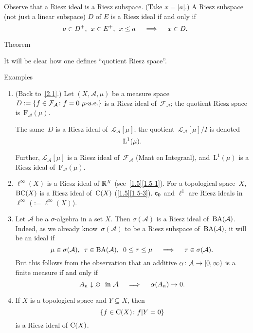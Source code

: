 \documentclass[main.tex]{subfiles}
\begin{document}
Observe that a Riesz ideal is a Riesz subspace. 
(Take $x=|a|$.)
A Riesz subspace (not just a linear subspace) $D$ of $E$
is a Riesz ideal if and only if 
\begin{equation*}
a\in D^+\text{, }\; x\in E^+\text{, }\; x\leq a 
  \quad \implies \quad x\in D\text{. }
\end{equation*}
%
%
\begin{psec}{2.7}{Theorem}

It will be clear
how one defines
``quotient Riesz space''.
\end{psec}
%
%
\begin{psec}{2.8}{Examples}
\begin{enumerate}
\item \label{2.8-1}%
(Back to~\ref{2.1}.)
Let $(X,\mathcal A, \mu)$ be a measure space
$D:=\{f\in {\mathcal F}_{\mathcal A}\colon f=0\ \mu\text{-a.e.} \}$
is a Riesz ideal of~${\mathcal F}_{\mathcal A}$;
the quotient Riesz space is~$\mathrm{F}_{\mathcal A} (\mu)$.

The same~$D$ is a Riesz ideal of~$\mathcal{L}_{\mathcal A}[\mu]$;
the quotient~${\mathcal L}_{\mathcal A}[\mu]/I$ is denoted
\begin{equation*}
\mathrm{L}^1(\mu)\text{.}
\end{equation*}

Further,
$\mathcal{L}_{\mathcal A}[\mu]$ 
is a Riesz ideal of~${\mathcal F}_{\mathcal A}$
(Maat en Integraal),
and~$\mathrm{L}^1(\mu)$ is a Riesz ideal of~$\mathrm{F}_{\mathcal A}(\mu)$.
%
\item \label{2.8-2}
$\ell^\infty(X)$ is a Riesz ideal of $\mathbb{R}^X$ (see~\ref{1.5}\ref{1.5-1}).
For a topological space~$X$, 
$\mathrm{BC}(X)$ is a Riesz ideal 
of~$\mathrm{C}(X)$ (\ref{1.5}\ref{1.5-3}).
$\mathsf{c}_0$ and $\ell^1$ are Riesz ideals 
in~$\ell^\infty$ ($:=\ell^\infty(X)$).
%
\item \label{2.8-3}
Let $\mathcal A$ be a $\sigma$-algebra in a set $X$.
Then $\sigma(\mathcal A)$ is a Riesz ideal of~$\mathrm{BA}(\mathcal A)$.
Indeed, as we already know~$\sigma(\mathcal A)$ 
to be a Riesz subspace of~$\mathrm{BA}(\mathcal A)$,
it will be an ideal if
\begin{equation*}
\mu\in \sigma(\mathcal A)\htam{, }\ 
\tau\in\BA(\mathcal A)\htam{, }\ 
0\leq \tau\leq \mu
\quad \implies \quad
\tau \in \sigma(\mathcal A)
\htam{.}
\end{equation*}
But this follows from the observation
that an additive $\alpha\colon\mathcal A\rightarrow [0,\infty)$
is a finite measure if and only if
\begin{equation*}
A_n \downarrow \varnothing\ \text{ in }\mathcal A 
\quad \implies \quad
\alpha(A_n)\rightarrow 0
\text{.}
\end{equation*}
%
\item \label{2.8-4}
If $X$ is a topological space and $Y\subseteq X$, then
\begin{equation*}
\{f\in\mathrm{C}(X)\colon f | Y=0 \}
\end{equation*}
is a Riesz ideal of $\mathrm{C}(X)$.


\end{enumerate}
\end{psec}
\end{document}
